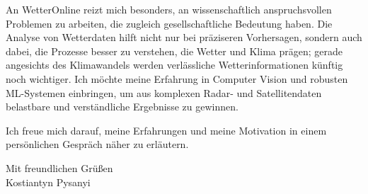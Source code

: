 \documentclass[11pt,a4paper]{article}
\begin{document}
An WetterOnline reizt mich besonders, an wissenschaftlich anspruchsvollen Problemen zu arbeiten, die zugleich gesellschaftliche Bedeutung haben. Die Analyse von Wetterdaten hilft nicht nur bei präziseren Vorhersagen, sondern auch dabei, die Prozesse besser zu verstehen, die Wetter und Klima prägen; gerade angesichts des Klimawandels werden verlässliche Wetterinformationen künftig noch wichtiger. Ich möchte meine Erfahrung in Computer Vision und robusten ML-Systemen einbringen, um aus komplexen Radar- und Satellitendaten belastbare und verständliche Ergebnisse zu gewinnen.

Ich freue mich darauf, meine Erfahrungen und meine Motivation in einem persönlichen Gespräch näher zu erläutern.

Mit freundlichen Grüßen\\[0.8em]
Kostiantyn Pysanyi
\end{document}
